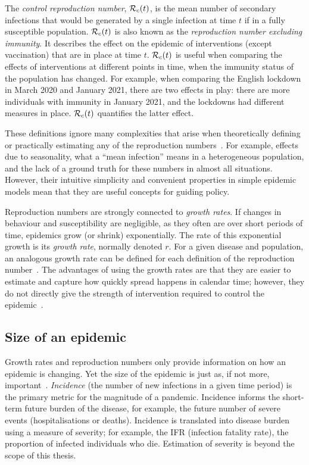 \documentclass[thesis.tex]{subfiles}
\begin{document}
The \emph{control reproduction number}, $\mathcal{R}_{c}(t)$, is the mean number of secondary infections that would be generated by a single infection at time $t$ if in a fully susceptible population.
$\mathcal{R}_{c}(t)$ is also known as the \emph{reproduction number excluding immunity}.
It describes the effect on the epidemic of interventions (except vaccination) that are in place at time $t$.
$\mathcal{R}_{c}(t)$ is useful when comparing the effects of interventions at different points in time, when the immunity status of the population has changed.
For example, when comparing the English lockdown in March 2020 and January 2021, there are two effects in play: there are more individuals with immunity in January 2021, and the lockdowns had different measures in place.
$\mathcal{R}_{c}(t)$ quantifies the latter effect.

These definitions ignore many complexities that arise when theoretically defining or practically estimating any of the reproduction numbers~\autocite{pellisEstimation}.
For example, effects due to seasonality, what a ``mean infection'' means in a heterogeneous population, and the lack of a ground truth for these numbers in almost all situations.
However, their intuitive simplicity and convenient properties in simple epidemic models mean that they are useful concepts for guiding policy.

Reproduction numbers are strongly connected to \emph{growth rates}.
If changes in behaviour and susceptibility are negligible, as they often are over short periods of time, epidemics grow (or shrink) exponentially.
The rate of this exponential growth is its \emph{growth rate}, normally denoted $r$.
For a given disease and population, an analogous growth rate can be defined for each definition of the reproduction number~\autocite{pellisEstimation,paragGrowthRates,wallingaGI}.
The advantages of using the growth rates are that they are easier to estimate and capture how quickly spread happens in calendar time; however, they do not directly give the strength of intervention required to control the epidemic~\autocite{royalSocietyRnumber}.

\subsection{Size of an epidemic}

Growth rates and reproduction numbers only provide information on how an epidemic is changing.
Yet the size of the epidemic is just as, if not more, important~\autocite{pellisEstimation}.
\emph{Incidence} (the number of new infections in a given time period) is the primary metric for the magnitude of a pandemic.
Incidence informs the short-term future burden of the disease, for example, the future number of severe events (hospitalisations or deaths).
Incidence is translated into disease burden using a measure of severity; for example, the IFR (infection fatality rate), the proportion of infected individuals who die.
Estimation of severity is beyond the scope of this thesis.
\end{document}
